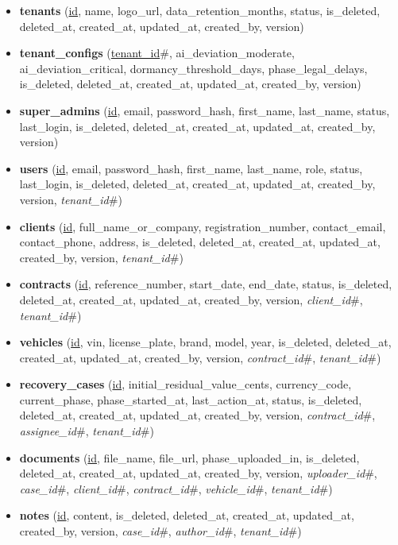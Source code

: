 \begin{sloppypar}
\begin{itemize}
\raggedright
    \item \textbf{tenants} (\underline{id}, name, logo\_url, data\_retention\_months, status, is\_deleted, deleted\_at, created\_at, updated\_at, created\_by, version)
    \item \textbf{tenant\_configs} (\underline{tenant\_id}\#, ai\_deviation\_moderate, ai\_deviation\_critical, dormancy\_threshold\_days, phase\_legal\_delays, is\_deleted, deleted\_at, created\_at, updated\_at, created\_by, version)
    \item \textbf{super\_admins} (\underline{id}, email, password\_hash, first\_name, last\_name, status, last\_login, is\_deleted, deleted\_at, created\_at, updated\_at, created\_by, version)
    \item \textbf{users} (\underline{id}, email, password\_hash, first\_name, last\_name, role, status, last\_login, is\_deleted, deleted\_at, created\_at, updated\_at, created\_by, version, \textit{tenant\_id}\#)
    \item \textbf{clients} (\underline{id}, full\_name\_or\_company, registration\_number, contact\_email, contact\_phone, address, is\_deleted, deleted\_at, created\_at, updated\_at, created\_by, version, \textit{tenant\_id}\#)
    \item \textbf{contracts} (\underline{id}, reference\_number, start\_date, end\_date, status, is\_deleted, deleted\_at, created\_at, updated\_at, created\_by, version, \textit{client\_id}\#, \textit{tenant\_id}\#)
    \item \textbf{vehicles} (\underline{id}, vin, license\_plate, brand, model, year, is\_deleted, deleted\_at, created\_at, updated\_at, created\_by, version, \textit{contract\_id}\#, \textit{tenant\_id}\#)
    \item \textbf{recovery\_cases} (\underline{id}, initial\_residual\_value\_cents, currency\_code, current\_phase, phase\_started\_at, last\_action\_at, status, is\_deleted, deleted\_at, created\_at, updated\_at, created\_by, version, \textit{contract\_id}\#, \textit{assignee\_id}\#, \textit{tenant\_id}\#)
    \item \textbf{documents} (\underline{id}, file\_name, file\_url, phase\_uploaded\_in, is\_deleted, deleted\_at, created\_at, updated\_at, created\_by, version, \textit{uploader\_id}\#, \textit{case\_id}\#, \textit{client\_id}\#, \textit{contract\_id}\#, \textit{vehicle\_id}\#, \textit{tenant\_id}\#)
    \item \textbf{notes} (\underline{id}, content, is\_deleted, deleted\_at, created\_at, updated\_at, created\_by, version, \textit{case\_id}\#, \textit{author\_id}\#, \textit{tenant\_id}\#)

\end{itemize}
\end{sloppypar}
